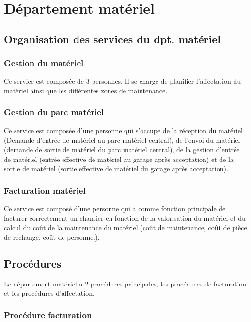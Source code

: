 \section{Département matériel}

\subsection{Organisation des services du dpt. matériel}


	\subsubsection{Gestion du matériel}

	Ce service est composée de 3 personnes. Il se charge de planifier
    l'affectation du matériel ainsi que les différentes zones de
    maintenance.
	
	\subsubsection{Gestion du parc matériel}
	
    Ce service est composée d'une personne qui s'occupe de la réception
    du matériel (Demande d'entrée de matériel au parc matériel central),
    de l'envoi du matériel (demande de sortie de matériel du parc matériel
    central), de la gestion d'entrée de matériel (entrée effective de
    matériel au garage après acceptation) et de la sortie de matériel
    (sortie effective de matériel du garage après acceptation).
		
	\subsubsection{Facturation matériel}
	
    Ce service est composé d'une personne qui a comme fonction principale de
    facturer correctement un chantier en fonction de la valorisation du
    matériel et du calcul du coût de la maintenance du matériel (coût de 
    maintenance, coût de pièce de rechange, coût de personnel).
	
\subsection{Procédures}
	
    Le département matériel a 2 procédures principales, les procédures de
    facturation et les procédures d'affectation.

\subsubsection{Procédure facturation}

